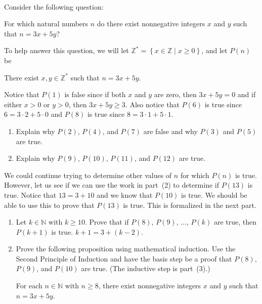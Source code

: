 \begin{prog} \label{A:lincomb3and5} \hfill \\
Consider the following question: 
\begin{list}{}
\item For which natural numbers  $n$  do there exist nonnegative integers  $x$  and  $y$  such that  $n = 3x + 5y$?
\end{list}

\newpar
To help answer this question, we will let
$\mathbb{Z}^*  = \left\{ {x \in \mathbb{Z} \mid x \geq 0} \right\}$,
and  let  $P \left( n \right)$ be
\begin{center}
There exist $x,y \in \mathbb{Z}^*$ such that $n = 3x + 5y$.
\end{center}
%
Notice that $P(1)$ is false since if both $x$ and $y$ are zero, then $3x + 5y = 0$ and if either $x > 0$ or $y > 0$, then $3x + 5y \geq 3$.  Also notice that $P(6)$ is true since $6 = 3 \cdot 2 + 5 \cdot 0$ and $P(8)$ is true since $8 = 3 \cdot 1 + 5 \cdot 1$.
\begin{enumerate}
  \item Explain why $P(2)$, $P(4)$, and $P(7)$ are false and why $P(3)$ and $P(5)$ are true.

  \item Explain why $P(9)$, $P(10)$, $P(11)$, and $P(12)$ are true.
\end{enumerate}
We could continue trying to determine other values of $n$ for which  $P(n)$ is true.  However, let us see if we can use the work in part~(2) to determine if $P(13)$ is true.  Notice that $13 = 3 + 10$ and we know that 
$P(10)$ is true.  We should be able to use this to prove that $P(13)$ is true.  This is formalized in the next part.
\setcounter{oldenumi}{\theenumi}
\begin{enumerate} \setcounter{enumi}{\theoldenumi}
\item Let  $k \in \mathbb{N}$  with  $k \geq 10$.  Prove that if  $P( 8 )$, $P ( 9 )$, $\ldots$, $P( k )$ are true, then $P( {k+1} )$ is true.  \hint  $k + 1 = 3 + \left( {k - 2} \right)$.

\item Prove the following proposition using mathematical induction.  Use the Second Principle of Induction and have the basis step be a proof that $P(8)$, $P(9)$, and $P(10)$ are true.  (The inductive step is part~(3).)

\begin{proposition} \label{prop:lincomb}
For each $n \in \mathbb{N}$ with  $n \geq 8$, there exist nonnegative integers  $x$  and  $y$  such that  $n = 3x + 5y$.
\end{proposition}
\end{enumerate}
\end{prog}
\hbreak


\newpar
\endinput
